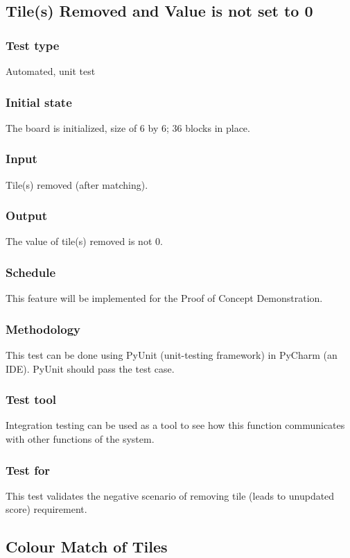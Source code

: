 \documentclass[12pt]{article}
\begin{document}
\newpage

\subsection{Tile(s) Removed and Value is not set to 0}
\subsubsection{Test type}
Automated, unit test
\subsubsection{Initial state}
The board is initialized, size of 6 by 6; 36 blocks in place.
\subsubsection{Input}
Tile(s) removed (after matching).
\subsubsection{Output}
The value of tile(s) removed is not 0.
\subsubsection{Schedule}
This feature will be implemented for the Proof of Concept Demonstration.
\subsubsection{Methodology}
This test can be done using PyUnit (unit-testing framework) in PyCharm (an IDE). PyUnit should pass the test case.
\subsubsection{Test tool}
Integration testing can be used as a tool to see how this function communicates with other functions of the system.
\subsubsection{Test for}
This test validates the negative scenario of  removing tile (leads to unupdated score) requirement. 

\newpage

\subsection{Colour Match of Tiles}
\end{document}
